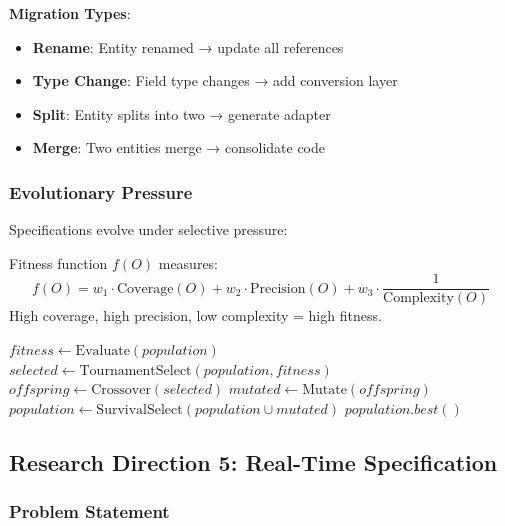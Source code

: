 \textbf{Migration Types}:
\begin{itemize}
    \item \textbf{Rename}: Entity renamed → update all references
    \item \textbf{Type Change}: Field type changes → add conversion layer
    \item \textbf{Split}: Entity splits into two → generate adapter
    \item \textbf{Merge}: Two entities merge → consolidate code
\end{itemize}

\subsubsection{Evolutionary Pressure}

Specifications evolve under selective pressure:

\begin{definition}
    Fitness function $f(O)$ measures:
    \begin{equation}
        f(O) = w_1 \cdot \text{Coverage}(O) + w_2 \cdot \text{Precision}(O) + w_3 \cdot \frac{1}{\text{Complexity}(O)}
    \end{equation}
    High coverage, high precision, low complexity = high fitness.
\end{definition}

\begin{algorithm}
\caption{Evolutionary Specification}
\begin{algorithmic}[1]
        \State $fitness \gets \text{Evaluate}(population)$
        \State $selected \gets \text{TournamentSelect}(population, fitness)$
        \State $offspring \gets \text{Crossover}(selected)$
        \State $mutated \gets \text{Mutate}(offspring)$
        \State $population \gets \text{SurvivalSelect}(population \cup mutated)$
    \EndFor
    \State \Return $population.best()$
\EndProcedure
\end{algorithmic}
\end{algorithm}

\subsection{Research Direction 5: Real-Time Specification}

\subsubsection{Problem Statement}

